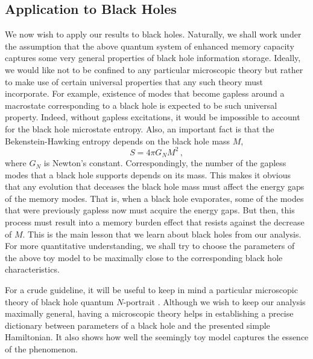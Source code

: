 \documentclass[aps,prd,reprint,superscriptaddress,nofootinbib]{revtex4-2}
\begin{document}
\subsection{Application to Black Holes}
\label{ssec:blackHole}

 We now wish to apply our results to black holes. 
Naturally, we shall work under the assumption 
that the above quantum system of enhanced memory capacity 
captures some very general properties 
of black hole information storage.  Ideally, we would like not to be
confined to any particular microscopic theory but rather 
to make use of certain universal properties that any such theory must 
incorporate. For example, existence of modes
that become gapless around a macrostate 
corresponding to a black hole is expected to be such 
universal property.  Indeed, without gapless excitations, it would be 
impossible to account for the black hole microstate entropy. 
Also, an important fact is that  
the Bekenstein-Hawking entropy  \cite{PhysRev.D7.2333}  
depends on the black hole mass $M$, 
 \begin{equation} \label{SBH}
	S = 4\pi G_NM^2\,, 
\end{equation} 
where $G_N$ is Newton's constant. 
Correspondingly, the number of the gapless modes 
that a black hole supports depends on its mass. 
This makes it obvious that any evolution that deceases the black hole 
mass must affect the energy gaps of the memory modes. That is, when 
a black hole evaporates, some of the modes that were previously gapless now must acquire the energy gaps.  
But then, this process must result into a memory burden effect that resists against the decrease of  $M$.  This is the main lesson that we learn about black holes from our 
analysis.  For more quantitative understanding, we shall try to 
choose the parameters of the above toy model to be maximally close 
to the corresponding black hole characteristics.  

For a crude guideline, it will be useful to keep in mind a particular 
microscopic theory of black hole quantum $N$-portrait \cite{1112.3359}. 
Although we wish to keep our analysis maximally general, 
having a microscopic theory helps in establishing a precise dictionary  
between parameters of a black hole and the presented simple 
Hamiltonian.  It also shows how well the seemingly toy model 
captures the essence of the phenomenon. 
\end{document}
